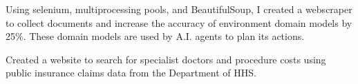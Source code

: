 \documentclass[]{deedy-resume-openfont}
\begin{document}
\begin{minipage}[t]{0.66\textwidth}
\begin{tightemize}
\item Using selenium, multiprocessing pools, and BeautifulSoup, I created a webscraper to collect documents and increase the accuracy of environment domain models by 25\%. These domain models are used by A.I. agents to plan its actions.
\end{tightemize}
\sectionsep

\begin{tightemize}
\item Created a website to search for specialist doctors and procedure costs using public insurance claims data from the Department of HHS.
\end{tightemize}

\end{minipage}
\end{document}
